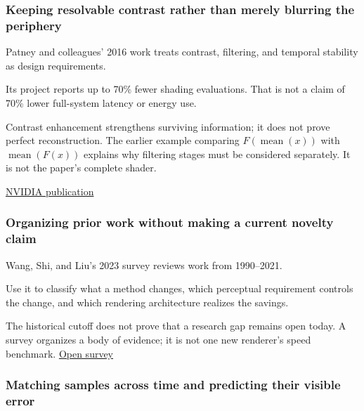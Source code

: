 \subsubsection{Keeping resolvable contrast rather than merely blurring the periphery}\label{04-visual-computing-ii-ch043-keeping-resolvable-contrast-rather-than-merely-blurring-the-periphery}

\hypertarget{04-visual-computing-ii-ch043-keeping-resolvable-contrast-rather-than-merely-blurring-the-periphery}{}

Patney and colleagues' 2016 work treats contrast, filtering, and temporal stability as design requirements.

Its project reports up to 70\% fewer shading evaluations. That is not a claim of 70\% lower full-system latency or energy use.

Contrast enhancement strengthens surviving information; it does not prove perfect reconstruction. The earlier example comparing \(F(\operatorname{mean}(x))\) with \(\operatorname{mean}(F(x))\) explains why filtering stages must be considered separately. It is not the paper's complete shader.

\href{https://research.nvidia.com/publication/2016-12_towards-foveated-rendering-gaze-tracked-virtual-reality}{NVIDIA publication}

\subsubsection{Organizing prior work without making a current novelty claim}\label{04-visual-computing-ii-ch043-organizing-prior-work-without-making-a-current-novelty-claim}

\hypertarget{04-visual-computing-ii-ch043-organizing-prior-work-without-making-a-current-novelty-claim}{}

Wang, Shi, and Liu's 2023 survey reviews work from 1990--2021.

Use it to classify what a method changes, which perceptual requirement controls the change, and which rendering architecture realizes the savings.

The historical cutoff does not prove that a research gap remains open today. A survey organizes a body of evidence; it is not one new renderer's speed benchmark. \href{https://link.springer.com/article/10.1007/s41095-022-0306-4}{Open survey}

\subsubsection{Matching samples across time and predicting their visible error}\label{04-visual-computing-ii-ch043-matching-samples-across-time-and-predicting-their-visible-error}

